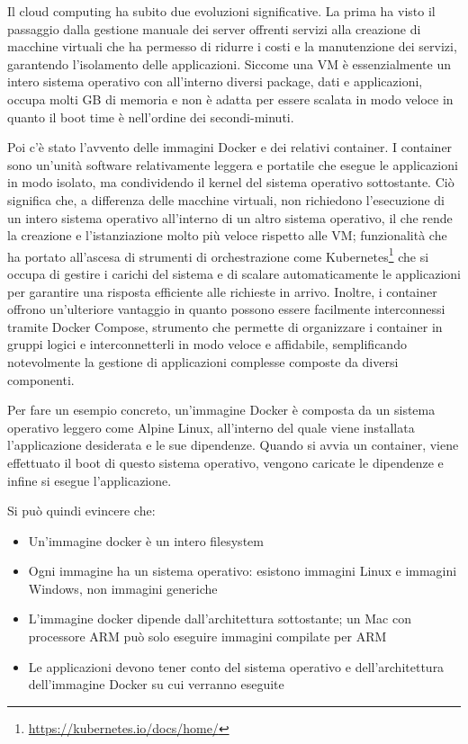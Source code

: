 Il cloud computing ha subito due evoluzioni significative. La prima ha visto il passaggio dalla gestione manuale dei
server offrenti servizi alla creazione di macchine virtuali che ha permesso di ridurre i costi e la manutenzione dei
servizi, garantendo l'isolamento delle applicazioni. Siccome una VM è essenzialmente un intero sistema operativo con
all'interno diversi package, dati e applicazioni, occupa molti GB di memoria e non è adatta per essere scalata in modo
veloce in quanto il boot time è nell'ordine dei secondi-minuti.

Poi c'è stato l'avvento delle immagini Docker e dei relativi container. I container sono un'unità software relativamente
leggera e portatile che esegue le applicazioni in modo isolato, ma condividendo il kernel del sistema operativo
sottostante. Ciò significa che, a differenza delle macchine virtuali, non richiedono l'esecuzione di un intero sistema
operativo all'interno di un altro sistema operativo, il che rende la creazione e l'istanziazione molto più veloce
rispetto alle VM; funzionalità che ha portato all'ascesa di strumenti di orchestrazione come
Kubernetes\footnote{\url{https://kubernetes.io/docs/home/}} che si occupa di gestire i carichi del sistema e di scalare
automaticamente le applicazioni per garantire una risposta efficiente alle richieste in arrivo. Inoltre, i container
offrono un'ulteriore vantaggio in quanto possono essere facilmente interconnessi tramite Docker Compose, strumento che
permette di organizzare i container in gruppi logici e interconnetterli in modo veloce e affidabile, semplificando
notevolmente la gestione di applicazioni complesse composte da diversi componenti.

Per fare un esempio concreto, un'immagine Docker è composta da un sistema operativo leggero come Alpine Linux,
all'interno del quale viene installata l'applicazione desiderata e le sue dipendenze. Quando si avvia un container,
viene effettuato il boot di questo sistema operativo, vengono caricate le dipendenze e infine si esegue l'applicazione.

Si può quindi evincere che:
\begin{itemize}
    \item Un'immagine docker è un intero filesystem
    \item Ogni immagine ha un sistema operativo: esistono immagini Linux e immagini Windows, non immagini generiche
    \item L'immagine docker dipende dall'architettura sottostante; un Mac con processore ARM può solo eseguire immagini
    compilate per ARM
    \item Le applicazioni devono tener conto del sistema operativo e dell'architettura dell'immagine Docker su cui
    verranno eseguite
\end{itemize}

